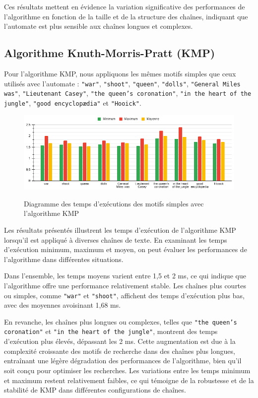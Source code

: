 \documentclass{article}
\begin{document}
Ces résultats mettent en évidence la variation significative des performances de l'algorithme en fonction de la taille et de la structure des chaînes, indiquant que l'automate est plus sensible aux chaînes longues et complexes.

\subsection{Algorithme Knuth-Morris-Pratt (KMP)}

Pour l'algorithme KMP, nous appliquons les mêmes motifs simples que ceux utilisés avec l'automate : \texttt{"war"}, \texttt{"shoot"}, \texttt{"queen"}, \texttt{"dolls"}, \texttt{"General Miles was"}, \texttt{"Lieutenant Casey"}, \texttt{"the queen's coronation"}, \texttt{"in the heart of the jungle"}, \texttt{"good encyclopædia"} et \texttt{"Hooick"}.

\begin{figure}[ht] %
    \centering
    \includegraphics[width=1\textwidth]{./ressources/test_kmp_motifs.png}
    \caption{Diagramme des temps d'exécutions des motifs simples avec l'algorithme KMP}
    \cite{test_kmp_motif}
    \label{fig:test_kmp_motif}
\end{figure}

Les résultats présentés illustrent les temps d'exécution de l'algorithme KMP lorsqu'il est appliqué à diverses chaînes de texte. En examinant les temps d'exécution minimum, maximum et moyen, on peut évaluer les performances de l'algorithme dans différentes situations.

Dans l'ensemble, les temps moyens varient entre 1,5 et 2 ms, ce qui indique que l'algorithme offre une performance relativement stable. Les chaînes plus courtes ou simples, comme \texttt{"war"} et \texttt{"shoot"}, affichent des temps d'exécution plus bas, avec des moyennes avoisinant 1,68 ms.

En revanche, les chaînes plus longues ou complexes, telles que \texttt{"the queen’s coronation"} et \texttt{"in the heart of the jungle"}, montrent des temps d'exécution plus élevés, dépassant les 2 ms. Cette augmentation est due à la complexité croissante des motifs de recherche dans des chaînes plus longues, entraînant une légère dégradation des performances de l'algorithme, bien qu'il soit conçu pour optimiser les recherches. Les variations entre les temps minimum et maximum restent relativement faibles, ce qui témoigne de la robustesse et de la stabilité de KMP dans différentes configurations de chaînes.
\end{document}
